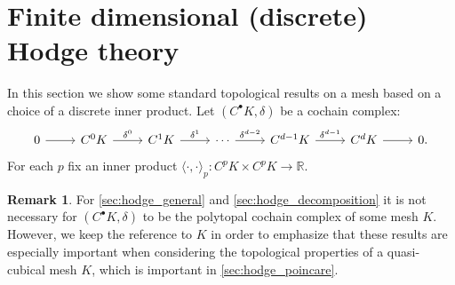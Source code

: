 \documentclass{elsarticle}
\theoremstyle{definition}
\newtheorem{remark}[theorem]{Remark}
\newcommand{\R}{\mathbb{R}} %
\newcommand{\inner}[2]{\langle#1,#2\rangle}
\begin{document}
\section{Finite dimensional (discrete) Hodge theory}
\label{sec:hodge}
In this section we show some standard topological results on a mesh based on a choice of a discrete inner product.
Let $(C^{\bullet} K, \delta)$ be a cochain complex:
\begin{equation}
  \begin{tikzcd}
    0 \arrow[r, ""] &
    C^0 K \arrow[r, "\delta^0"] &
    C^1 K \arrow[r, "\delta^1"] &
    \cdots \arrow[r, "\delta^{d - 2}"] &
    C^{d - 1} K \arrow[r, "\delta^{d - 1}"] &
    C^d K \arrow[r, ""] &
    0.
  \end{tikzcd}
\end{equation}
For each $p$ fix an inner product $\inner{\cdot}{\cdot}_p \colon C^p K \times C^p K \to \R$.
\begin{remark}
  For \ref{sec:hodge_general} and \ref{sec:hodge_decomposition} it is not necessary for $(C^{\bullet} K, \delta)$ to be the polytopal cochain complex of some mesh $K$. However, we keep the reference to $K$ in order to emphasize that these results are especially important when considering the topological properties of a quasi-cubical mesh $K$, which is important in \ref{sec:hodge_poincare}.
\end{remark}
\end{document}
